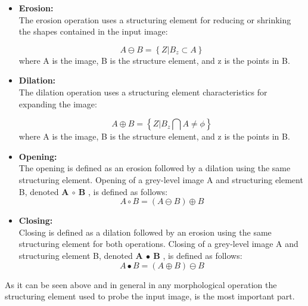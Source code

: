 \begin{itemize}
        \item {\textbf{Erosion:}}\\
            The erosion operation uses a structuring
            element for reducing or shrinking the shapes contained in the input image:
        
            \begin{equation}
                 A \ominus B = \left\{Z |  B_{z} \subset A \right\}
                \label{equ:Erosion-function}
                \end{equation}
            where A is the image, B is the structure element, and z is the points in B.
                
    \item {\textbf{Dilation:}}\\
            The dilation operation uses a structuring element characteristics for expanding the image:
        
            \begin{equation}
                A \oplus  B = \left\{Z |  B_{z} \bigcap  A \neq \phi  \right\}
                \label{equ:Dilation-function}
            \end{equation}
            where A is the image, B is the structure element, and z is the points in B.
            \item {\textbf{Opening:}}\\
            The opening is defined as an erosion followed by a dilation using the same structuring element. Opening of a grey-level image A and structuring element B, denoted \textbf{A $\circ $ B} , is defined as follows:
        \begin{equation}
            A \circ  B = \left ( A \ominus B \right ) \oplus B
            \label{equ:Opening-function}
        \end{equation}
            
            \item {\textbf{Closing:}}\\
            Closing is defined as a dilation followed by an erosion using the same structuring element for both operations. Closing of a grey-level image A and structuring element B, denoted \textbf{A $\bullet$ B} , is defined as follows:
        \begin{equation}
            A \bullet B = \left ( A \oplus   B \right ) \ominus B
            \label{equ:Clocing-function}
        \end{equation}
            
    \end{itemize}
\noindent
As it can be seen above and in general in any morphological operation the structuring element used to probe the input image, is the most important part.


